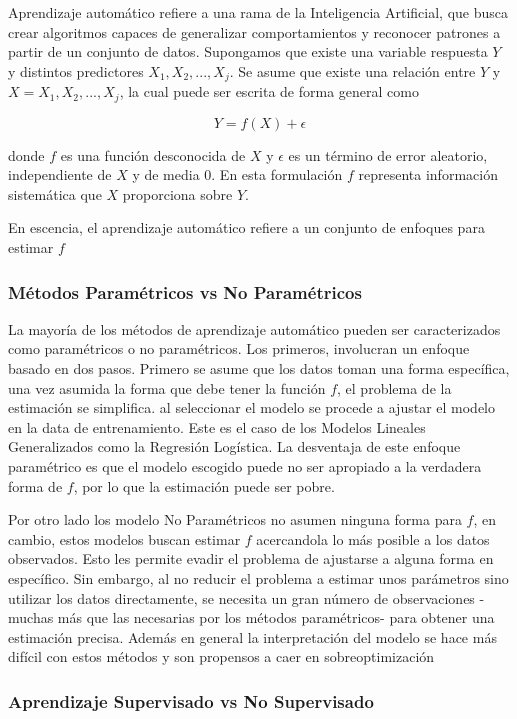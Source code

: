 \documentclass[a4paper,12pt]{Latex/Classes/PhDthesisPSnPDF}
\begin{document}
Aprendizaje automático refiere a una rama de la Inteligencia Artificial, que busca crear algoritmos capaces de generalizar comportamientos y reconocer patrones a partir de un conjunto de datos. Supongamos que existe una variable respuesta $Y$ y distintos predictores $X_{1}, X_{2}, ..., X_{j}$. Se asume que existe una relación entre $Y$ y $X = X_{1}, X_{2}, ..., X_{j}$, la cual puede ser escrita de forma general como

$$ Y = f(X) + \epsilon $$

donde $f$ es una función desconocida de $X$ y $\epsilon$ es un término de error aleatorio, independiente de $X$ y de media 0. En esta formulación $f$ representa información sistemática que $X$ proporciona sobre $Y$.

En escencia, el aprendizaje automático refiere a un conjunto de enfoques para estimar $f$

\subsubsection{Métodos Paramétricos vs No Paramétricos}

La mayoría de los métodos de aprendizaje automático pueden ser caracterizados como paramétricos o no paramétricos. Los primeros, involucran un enfoque basado en dos pasos. Primero se asume que los datos toman una forma específica, una vez asumida la forma que debe tener la función $f$, el problema de la estimación se simplifica. al seleccionar el modelo se procede a ajustar el modelo en la data de entrenamiento. Este es el caso de los Modelos Lineales Generalizados como la Regresión Logística. La desventaja de este enfoque paramétrico es que el modelo escogido puede no ser apropiado a la verdadera forma de $f$, por lo que la estimación puede ser pobre.

Por otro lado los modelo No Paramétricos no asumen ninguna forma para $f$, en cambio, estos modelos buscan estimar $f$ acercandola lo más posible a los datos observados. Esto les permite evadir el problema de ajustarse a alguna forma en específico. Sin embargo, al no reducir el problema a estimar unos parámetros sino utilizar los datos directamente, se necesita un gran número de observaciones -muchas más que las necesarias por los métodos paramétricos- para obtener una estimación precisa. Además en general la interpretación del modelo se hace más difícil con estos métodos y son propensos a caer en sobreoptimización

\subsubsection{Aprendizaje Supervisado vs No Supervisado}
\end{document}
